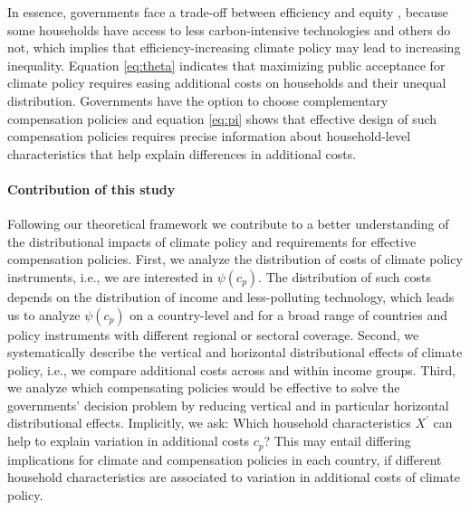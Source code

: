 \documentclass[12pt, a4paper]{article}
\begin{document}
In essence, governments face a trade-off between efficiency and equity \autocite{Hansel.2022,TerryDinan.2016}, because some households have access to less carbon-intensive technologies and others do not, which implies that efficiency-increasing climate policy may lead to increasing inequality. Equation \ref{eq:theta} indicates that maximizing public acceptance for climate policy requires easing additional costs on households and their unequal distribution. Governments have the option to choose complementary compensation policies and equation \ref{eq:pi} shows that effective design of such compensation policies requires precise information about household-level characteristics that help explain differences in additional costs. 

\paragraph{Contribution of this study}
Following our theoretical framework we contribute to a better understanding of the distributional impacts of climate policy and requirements for effective compensation policies. First, we analyze the distribution of costs of climate policy instruments, i.e., we are interested in $\psi(c_{p})$. The distribution of such costs depends on the distribution of income and less-polluting technology, which leads us to analyze $\psi(c_{p})$ on a country-level and for a broad range of countries and policy instruments with different regional or sectoral coverage. Second, we systematically describe the vertical and horizontal distributional effects of climate policy, i.e., we compare additional costs across and within income groups. Third, we analyze which compensating policies would be effective to solve the governments' decision problem by reducing vertical and in particular horizontal distributional effects. Implicitly, we ask: Which household characteristics $X^{\prime}$ can help to explain variation in additional costs $c_{p}$? This may entail differing implications for climate and compensation policies in each country, if different household characteristics are associated to variation in additional costs of climate policy.    

\end{document}
